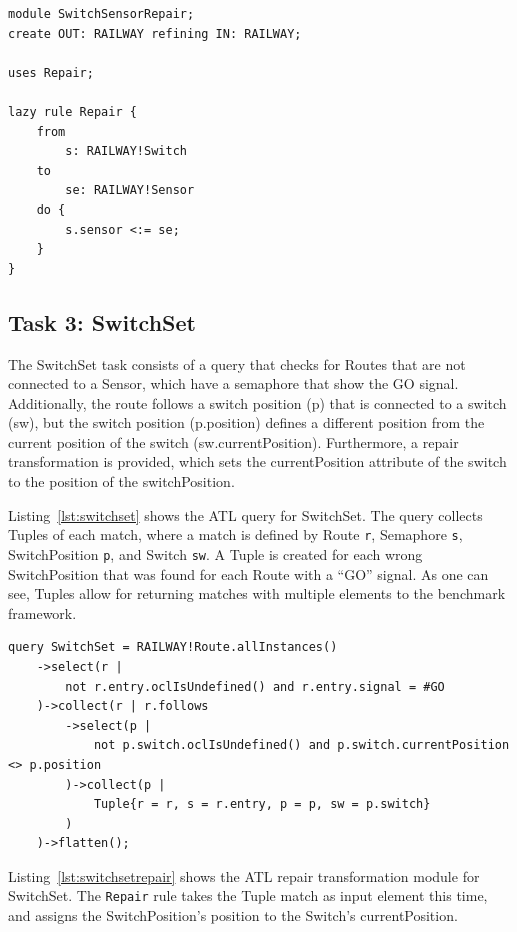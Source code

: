 \documentclass[submission,copyright,creativecommons]{eptcs}
\begin{document}
\lstset{language=atl}
\begin{lstlisting}[float=htb, caption={SwitchSensor repair transformation module in ATL}, label=lst:switchsensorrepair, captionpos=b, frame=tb, belowskip=-10pt]
module SwitchSensorRepair;
create OUT: RAILWAY refining IN: RAILWAY;

uses Repair;

lazy rule Repair {
	from
		s: RAILWAY!Switch
	to
		se: RAILWAY!Sensor
	do {
		s.sensor <:= se;
	}
}
\end{lstlisting}

\subsection{Task 3: SwitchSet}

The SwitchSet task consists of a query that checks for Routes that are not connected to a Sensor, which have a semaphore that show the GO signal. Additionally, the route follows a switch position (p) that is connected to a switch (sw), but the switch position (p.position) defines a different position from the current position of the switch (sw.currentPosition). Furthermore, a repair transformation is provided, which sets the currentPosition attribute of the switch to the position of the switchPosition. 

Listing~\ref{lst:switchset} shows the ATL query for SwitchSet. The query collects Tuples of each match, where a match is defined by Route \texttt{r}, Semaphore \texttt{s}, SwitchPosition \texttt{p}, and Switch \texttt{sw}. A Tuple is created for each wrong SwitchPosition that was found for each Route with a ``GO'' signal. As one can see, Tuples allow for returning matches with multiple elements to the benchmark framework.

\lstset{language=atl}
\begin{lstlisting}[float=htb, caption={SwitchSet query in ATL}, label=lst:switchset, captionpos=b, frame=tb, belowskip=-10pt]
query SwitchSet = RAILWAY!Route.allInstances()
	->select(r | 
		not r.entry.oclIsUndefined() and r.entry.signal = #GO
	)->collect(r | r.follows
		->select(p | 
			not p.switch.oclIsUndefined() and p.switch.currentPosition <> p.position
		)->collect(p | 
			Tuple{r = r, s = r.entry, p = p, sw = p.switch}
		)
	)->flatten();
\end{lstlisting}

Listing~\ref{lst:switchsetrepair} shows the ATL repair transformation module for SwitchSet. The \texttt{Repair} rule takes the Tuple match as input element this time, and assigns the SwitchPosition's position to the Switch's currentPosition.
\end{document}
